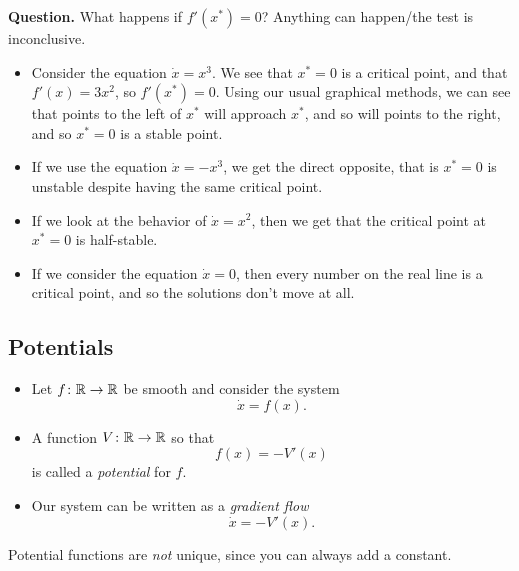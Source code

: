 \documentclass[class=article, crop=false]{standalone}
\begin{document}
  \textbf{Question.} What happens if $f'(x^*) = 0$? Anything can happen/the test is inconclusive. \par
  \begin{itemize}
    \item Consider the equation $\dot{x} = x^3$. We see that $x^* = 0$ is a critical point, and that $f'(x) = 3x^2$, so $f'(x^*) = 0$. Using our usual graphical methods, we can see that points to the left of $x^*$ will approach $x^*$, and so will points to the right, and so $x^* = 0$ is a stable point.
    \item If we use the equation $\dot{x} = -x^3$, we get the direct opposite, that is $x^* = 0$ is unstable despite having the same critical point.
    \item If we look at the behavior of $\dot{x} = x^2$, then we get that the critical point at $x^* = 0$ is half-stable.
    \item If we consider the equation $\dot{x} = 0$, then every number on the real line is a critical point, and so the solutions don't move at all.
  \end{itemize}
  \subsection{Potentials}
  \begin{itemize}
    \item Let $f\colon \mathbb{R}\to \mathbb{R}$ be smooth and consider the system
    \[
      \dot{x} = f(x).
    \]
    \item A function $V\colon \mathbb{R}\to \mathbb{R}$ so that
    \[
      f(x) = -V'(x)
    \]
    is called a \emph{potential} for $f$.
    \item Our system can be written as a \emph{gradient flow}
    \[
      \dot{x} = -V'(x).
    \]
  \end{itemize}
  \begin{note}{}
    Potential functions are \emph{not} unique, since you can always add a constant.
  \end{note}
\end{document}
